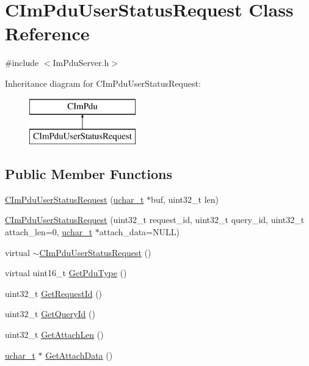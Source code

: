 \hypertarget{class_c_im_pdu_user_status_request}{}\section{C\+Im\+Pdu\+User\+Status\+Request Class Reference}
\label{class_c_im_pdu_user_status_request}


{\ttfamily \#include $<$Im\+Pdu\+Server.\+h$>$}

Inheritance diagram for C\+Im\+Pdu\+User\+Status\+Request\+:\begin{figure}[H]
\begin{center}
\leavevmode
\includegraphics[height=2.000000cm]{class_c_im_pdu_user_status_request}
\end{center}
\end{figure}
\subsection*{Public Member Functions}
\begin{DoxyCompactItemize}
\item 
\hyperlink{class_c_im_pdu_user_status_request_aaab5ef666f94cc50c842a455ec91c32f}{C\+Im\+Pdu\+User\+Status\+Request} (\hyperlink{base_2ostype_8h_a124ea0f8f4a23a0a286b5582137f0b8d}{uchar\+\_\+t} $\ast$buf, uint32\+\_\+t len)
\item 
\hyperlink{class_c_im_pdu_user_status_request_aebbc54d360727b0209cde8aa259b7d43}{C\+Im\+Pdu\+User\+Status\+Request} (uint32\+\_\+t request\+\_\+id, uint32\+\_\+t query\+\_\+id, uint32\+\_\+t attach\+\_\+len=0, \hyperlink{base_2ostype_8h_a124ea0f8f4a23a0a286b5582137f0b8d}{uchar\+\_\+t} $\ast$attach\+\_\+data=N\+U\+L\+L)
\item 
virtual \hyperlink{class_c_im_pdu_user_status_request_a64a42b65f68310e0f7de2d54648dc24f}{$\sim$\+C\+Im\+Pdu\+User\+Status\+Request} ()
\item 
virtual uint16\+\_\+t \hyperlink{class_c_im_pdu_user_status_request_acfcde30219e93fc11b29dfb05c505f4e}{Get\+Pdu\+Type} ()
\item 
uint32\+\_\+t \hyperlink{class_c_im_pdu_user_status_request_aed439af77186da0379ecbe594a297307}{Get\+Request\+Id} ()
\item 
uint32\+\_\+t \hyperlink{class_c_im_pdu_user_status_request_a3d7ee7e442e96ca42d719ad53a3bb836}{Get\+Query\+Id} ()
\item 
uint32\+\_\+t \hyperlink{class_c_im_pdu_user_status_request_aca95799970d7973f24c570f1c80ab3c7}{Get\+Attach\+Len} ()
\item 
\hyperlink{base_2ostype_8h_a124ea0f8f4a23a0a286b5582137f0b8d}{uchar\+\_\+t} $\ast$ \hyperlink{class_c_im_pdu_user_status_request_ad27124b6a0f57f3ef1a8a2c5d22a3374}{Get\+Attach\+Data} ()
\end{DoxyCompactItemize}
